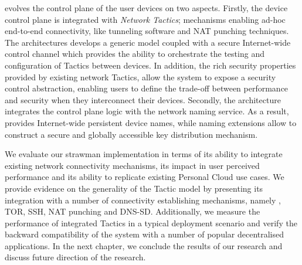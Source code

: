 \signpost evolves the control plane of the user devices on two aspects. Firstly,
the device control plane is integrated with \textit{Network Tactics}; mechanisms
enabling ad-hoc end-to-end connectivity, like tunneling software and NAT
punching techniques. The architectures develops a generic model coupled with a
secure Internet-wide control channel which provides the ability to orchestrate
the testing and configuration of Tactics between devices.  In addition, the rich
security properties provided by existing network Tactics, allow the system to
expose a security control abstraction, enabling users to define the trade-off
between performance and security when they interconnect their devices.
Secondly, the architecture integrates the control plane logic with the network
naming service. As a result, \signpost provides Internet-wide persistent device
names, while \dnssec naming extensions allow \signpost to construct a secure and
globally accessible key distribution mechanism.

We evaluate our strawman \signpost implementation in terms of its ability to
integrate existing network connectivity mechanisms, its impact in user perceived
performance and its ability to replicate existing Personal Cloud use cases. We
provide evidence on the generality of the \signpost Tactic model by presenting
its integration with a number of connectivity establishing mechanisms, namely
\openvpn, TOR, SSH, NAT punching and DNS-SD.  Additionally, we measure the
performance of integrated Tactics in a typical deployment scenario and verify
the backward compatibility of the system with a number of popular decentralised
applications. In the next chapter, we conclude the results of our research and
discuss future direction of the research.  


